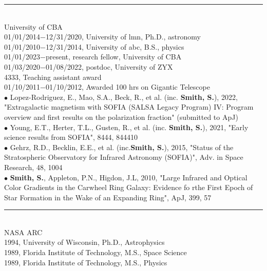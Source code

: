 \medskip \hrule \vspace{5pt} \medskip
\myNameBoldface{\color{\myNameColor}{\myNameSize Dr. Sally Smith (Science PI):}}\\
University of CBA
\mySectionSpacing
{}\\
01/01/2014$-$12/31/2020, University of lmn, Ph.D., astronomy\\
01/01/2010$-$12/31/2014, University of abc, B.S., physics
\mySectionSpacing
{}\\
01/01/2023$-$present, research fellow, University of CBA\\
01/03/2020$-$01/08/2022, postdoc, University of ZYX
\mySectionSpacing
{}\\
4333, Teaching assistant award\\
01/10/2011$-$01/10/2012, Awarded 100 hrs on Gigantic Telescope
\mySectionSpacing
{}\\
{\scriptsize{$\bullet$}} Lopez-Rodriguez, E., Mao, S.A., Beck, R., et al. (inc. \textbf{Smith, S.}), 2022, "Extragalactic magnetism with SOFIA (SALSA Legacy Program) IV: Program overview and first results on the polarization fraction" (submitted to ApJ)\\
{\scriptsize{$\bullet$}} Young, E.T., Herter, T.L., Gusten, R., et al. (inc. \textbf{Smith, S.}), 2021, "Early science results from SOFIA", 8444, 844410\\
{\scriptsize{$\bullet$}} Gehrz, R.D., Becklin, E.E., et al. (inc.\textbf{Smith, S.}), 2015, "Status of the Stratospheric Observatory for Infrared Astronomy (SOFIA)", Adv. in Space Research, 48, 1004\\
{\scriptsize{$\bullet$}} \textbf{Smith, S.}, Appleton, P.N., Higdon, J.L, 2010, "Large Infrared and Optical Color Gradients in the Carwheel Ring Galaxy: Evidence fo rthe First Epoch of Star Formation in the Wake of an Expanding Ring", ApJ, 399, 57
\medskip \hrule \vspace{5pt} \medskip
\myNameBoldface{\color{\myNameColor}{\myNameSize Dr. Pamela M. Marcum (co-Investigator):}}\\
NASA ARC
\mySectionSpacing
{}\\
1994, University of Wisconsin, Ph.D., Astrophysics\\
1989, Florida Institute of Technology, M.S., Space Science\\
1989, Florida Institute of Technology, M.S., Physics\\
